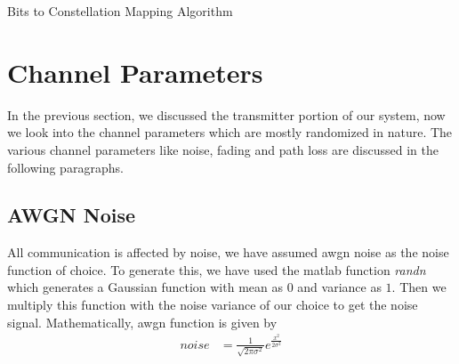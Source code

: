 \begin{algorithm}[!htbp]
\caption{Bits to Constellation Mapping Algorithm}
\label{alg:Working of Modulator}
\begin{algorithmic}
			\ELSE
			\ENDIF
		\ENDIF
	\ENDIF
		\ENDWHILE
	\ENDIF
\ENDWHILE
\end{algorithmic}
\end{algorithm} 




\section{Channel Parameters}
In the previous section, we discussed the transmitter portion of our system, now we look into the channel parameters which are mostly randomized in nature. The various channel parameters like noise, fading and path loss are discussed in the following paragraphs.

\subsection{AWGN Noise}
All communication is affected by noise, we have assumed \acrlong{awgn} noise as the noise function of choice. To generate this, we have used the \gls{matlab} function \emph{randn} which generates a Gaussian function with mean as $0$ and variance as $1$. Then we multiply this function with the noise variance of our choice to get the noise signal. Mathematically, \acrshort{awgn} function is given by 
\begin{align*}
noise&= \frac{1}{\sqrt{2\pi\sigma^2}}e^{\frac{x^2}{2\sigma^2}}
\end{align*}

